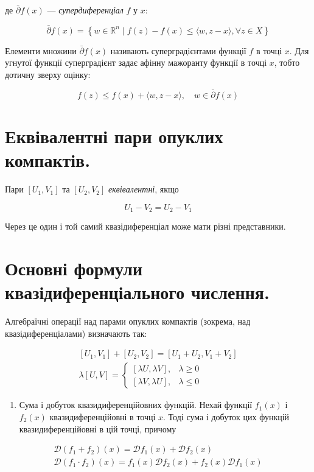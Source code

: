 \documentclass[12pt,a4paper]{extarticle}
\numberwithin{section}{part}
\begin{document}
де $\bar{\partial} f(x)$ --- \textit{супердиференціал} $f$ у $x$:

$$
\bar{\partial} f(x)=\left\{w \in \mathbb{R}^{n} \mid f(z)-f(x) \leq\langle w, z-x\rangle, \forall z \in X\right\}
$$

Елементи множини $\bar{\partial} f(x)$ називають суперградієнтами функції $f$ в точці $x$. Для угнутої функції суперградієнт задає афінну мажоранту функції в точці $x$, тобто дотичну зверху оцінку:

$$
f(z) \leq f(x)+\langle w, z-x\rangle, \quad w \in \bar{\partial} f(x)
$$

\section{Еквівалентні пари опуклих компактів.}
Пари $\left[U_{1}, V_{1}\right]$ та $\left[U_{2}, V_{2}\right]$ \textit{еквівалентні}, якщо

$$
U_{1}-V_{2}=U_{2}-V_{1}
$$

Через це один і той самий квазідиференціал може мати різні представники.

\section{Основні формули квазідиференціального числення.}
Алгебраїчні операції над парами опуклих компактів (зокрема, над квазідиференціалами) визначають так:

$$
\begin{gathered}
{\left[U_{1}, V_{1}\right]+\left[U_{2}, V_{2}\right]=\left[U_{1}+U_{2}, V_{1}+V_{2}\right]} \\
\lambda[U, V]= \begin{cases}{[\lambda U, \lambda V],} & \lambda \geq 0 \\
{[\lambda V, \lambda U],} & \lambda \leq 0\end{cases}
\end{gathered}
$$

\begin{enumerate}
  \item Сума і добуток квазидиференційовних функцій. Нехай функції $f_{1}(x)$ і $f_{2}(x)$ квазидиференційовні в точці $x$. Тоді сума і добуток цих функцій квазидиференційовні в цій точці, причому
\end{enumerate}

$$
\begin{gathered}
\mathcal{D}\left(f_{1}+f_{2}\right)(x)=\mathcal{D} f_{1}(x)+\mathcal{D} f_{2}(x) \\
\mathcal{D}\left(f_{1} \cdot f_{2}\right)(x)=f_{1}(x) \mathcal{D} f_{2}(x)+f_{2}(x) \mathcal{D} f_{1}(x)
\end{gathered}
$$
\end{document}
